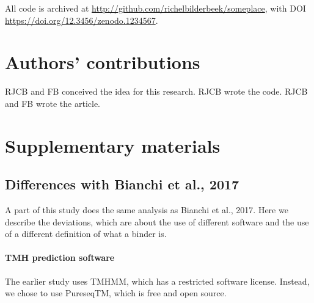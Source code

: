All code is archived at \url{http://github.com/richelbilderbeek/someplace},
with DOI \url{https://doi.org/12.3456/zenodo.1234567}.

\section{Authors' contributions}

RJCB and FB conceived the idea for this research. 
RJCB wrote the code.
RJCB and FB wrote the article.





\appendix
\section{Supplementary materials}

\subsection{Differences with Bianchi et al., 2017}

A part of this study does the same analysis as Bianchi et al., 2017.
Here we describe the deviations, which are about the use of different
software and the use of a different definition of what a binder is.

\paragraph{TMH prediction software}

The earlier study uses TMHMM, which has a restricted software license.
Instead, we chose to use PureseqTM, which is free and open source.



